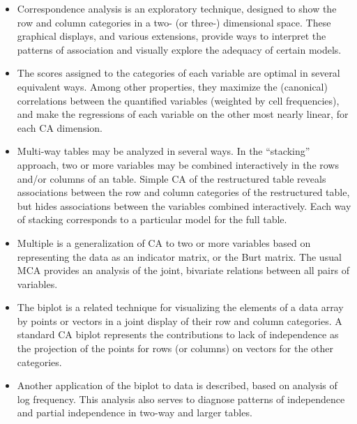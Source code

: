 \begin{itemize}
\item Correspondence analysis is an exploratory technique, designed to
show the row and column categories in a two- (or three-) dimensional
space.  These graphical displays, and various extensions, provide
ways to interpret the patterns of association and visually explore 
the adequacy of certain \loglin models.

\item The scores assigned to the categories of each variable are optimal
in several equivalent ways.
Among other properties,
they maximize the (canonical) correlations between the quantified
variables (weighted by cell frequencies), and make the regressions
of each variable on the other most nearly linear, for each CA dimension.

\item Multi-way tables may be analyzed in several ways.
In the ``stacking'' approach, two or more variables may be combined
interactively in the rows and/or columns of an \nway table.
Simple CA of the restructured table reveals associations between
the row and column categories of the restructured table,
but hides associations between the variables combined interactively.
Each way of stacking corresponds to a particular \loglin model
for the full table.

\item Multiple \ca is a generalization of CA to two or more variables
based on representing the data as an indicator matrix, or the Burt matrix.
The usual MCA provides an analysis of the joint, bivariate relations
between all pairs of variables.


\item The biplot is a related technique for visualizing the elements of
a data array by points or vectors in a joint display of their row and
column categories. A standard CA biplot represents the contributions to
lack of independence as the projection of the points for rows
(or columns) on vectors for the other categories.

\item Another application of the biplot to \ctab data is described, based on analysis
of log frequency.
This analysis also serves to diagnose patterns of independence and
partial independence in two-way and larger tables.
\end{itemize}
